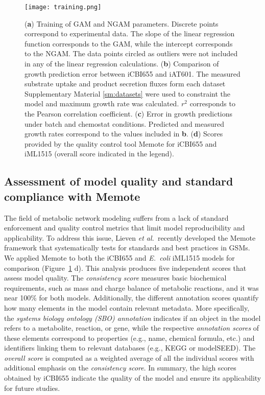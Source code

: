 \begin{figure}[hp]
    \centering
    \texttt{[image: training.png]}
    \caption[Training of iCBI655 model]{%
        (\textbf{a}) Training of GAM and NGAM parameters. Discrete points correspond to experimental data.
    The slope of the linear regression function corresponds to the GAM, while the intercept corresponds to the NGAM.
    The data points circled as outliers were not included in any of the linear regression calculations. (\textbf{b}) Comparison of growth prediction error between iCBI655 and iAT601.
    The measured substrate uptake and product secretion fluxes form each dataset Supplementary Material \ref{sm:datasets} were used to constraint the model and maximum growth rate was calculated.
    $r^2$ corresponds to the Pearson correlation coefficient.
    (\textbf{c}) Error in growth predictions under batch and chemostat conditions.
    Predicted and measured growth rates correspond to the values included in \textbf{b}. (\textbf{d}) Scores provided by the quality control tool Memote\citep{lieven2018} for iCBI655 and iML1515 (overall score indicated in the legend).}
   \label{fig6:training}
\end{figure}

\subsection{Assessment of model quality and standard compliance with Memote}
The field of metabolic network modeling suffers from a lack of standard enforcement and quality control metrics that limit model reproducibility and applicability.
To address this issue, Lieven \textit{et al.}\ recently developed the Memote framework that systematically tests for standards and best practices in GSMs.\citep{lieven2018}
We applied Memote to both the iCBI655 and \textit{E.~coli} iML1515 models for comparison (Figure~\ref{fig6:training} d). This analysis produces five independent scores that assess model quality.
The \emph{consistency score}  measures basic biochemical requirements, such as mass and charge balance of metabolic reactions, and it was near 100\% for both models.
Additionally, the different annotation scores quantify how many elements in the model contain relevant metadata. More specifically, the \emph{systems biology ontology (SBO) annotation} indicates if an object in the model refers to a metabolite, reaction, or gene, while the respective \emph{annotation scores} of these elements correspond to properties (e.g., name, chemical formula, etc.) and identifiers linking them to relevant databases (e.g., KEGG\citep{kanehisa2000} or modelSEED\citep{henry2010}). The \emph{overall score} is computed as a weighted average of all the individual scores with additional emphasis on the \emph{consistency score}.
In summary, the high scores obtained by iCBI655 indicate the quality of the model and ensure its applicability for future studies.


